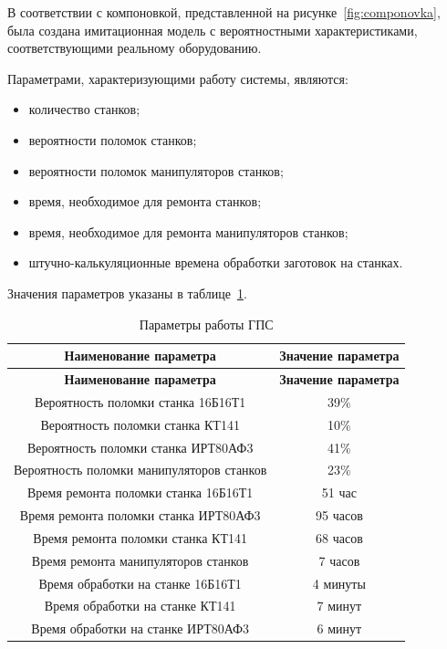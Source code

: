 В соответствии с компоновкой, представленной на рисунке~\ref{fig:componovka}, была создана имитационная модель с вероятностными характеристиками, соответствующими реальному оборудованию.

Параметрами, характеризующими работу системы, являются:

\begin{itemize}
    \item количество станков;
    \item вероятности поломок станков;
    \item вероятности поломок манипуляторов станков;
    \item время, необходимое для ремонта станков;
    \item время, необходимое для ремонта манипуляторов станков;
    \item штучно-калькуляционные времена обработки заготовок на станках.
\end{itemize}

Значения параметров указаны в таблице~\ref{tab:parameters}.

\begin{longtable}[c]{|c|c|}
    \caption{Параметры работы ГПС}
    \label{tab:parameters}\\
    \hline
    \textbf{Наименование параметра} & \textbf{Значение параметра}\\
    \hline
    \endfirsthead
    \hline
    \textbf{Наименование параметра} & \textbf{Значение параметра}\\
    \hline
    \endhead
        Вероятность поломки станка 16Б16Т1 & 39\%\\
        \hline
        Вероятность поломки станка КТ141 & 10\%\\
        \hline
        Вероятность поломки станка ИРТ80АФ3 & 41\%\\
        \hline
        Вероятность поломки манипуляторов станков & 23\%\\
        \hline
        Время ремонта поломки станка 16Б16Т1 & 51 час\\
        \hline
        Время ремонта поломки станка ИРТ80АФ3 & 95 часов\\
        \hline
        Время ремонта поломки станка КТ141 & 68 часов\\
        \hline
        Время ремонта манипуляторов станков & 7 часов\\
        \hline
        Время обработки на станке 16Б16Т1 & 4 минуты\\
        \hline
        Время обработки на станке КТ141 & 7 минут\\
        \hline
        Время обработки на станке ИРТ80АФ3 & 6 минут\\
        \hline
\end{longtable}

